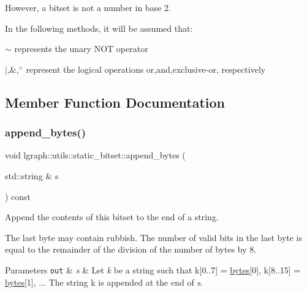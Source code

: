 However, a bitset is not a number in base 2.

In the following methods, it will be assumed that\+:
\begin{DoxyItemize}
\item $\sim$ represents the unary N\+OT operator
\item $\vert$,\&,$^\wedge$ represent the logical operations or,and,exclusive-\/or, respectively 
\end{DoxyItemize}

\subsection{Member Function Documentation}
\mbox{\label{classlgraph_1_1utils_1_1static__bitset_a38978e91cd3e39ce45417a0f3d0d6162}} 
\subsubsection{\texorpdfstring{append\+\_\+bytes()}{append\_bytes()}}
{\footnotesize\ttfamily void lgraph\+::utils\+::static\+\_\+bitset\+::append\+\_\+bytes (\begin{DoxyParamCaption}\item[{std\+::string \&}]{s }\end{DoxyParamCaption}) const}



Append the contents of this bitset to the end of a string. 

The last byte may contain rubbish. The number of valid bits in the last byte is equal to the remainder of the division of the number of bytes by 8.


\begin{DoxyParams}[1]{Parameters}
\mbox{\tt out}  & {\em s} & Let {\itshape k} be a string such that k\mbox{[}0..7\mbox{]} = \hyperlink{classlgraph_1_1utils_1_1static__bitset_a56d277fc22bbf71a27fca530a133c9bd}{bytes}\mbox{[}0\mbox{]}, k\mbox{[}8..15\mbox{]} = \hyperlink{classlgraph_1_1utils_1_1static__bitset_a56d277fc22bbf71a27fca530a133c9bd}{bytes}\mbox{[}1\mbox{]}, ... The string k is appended at the end of {\itshape s}. \\
\hline
\end{DoxyParams}
\mbox{\label{classlgraph_1_1utils_1_1static__bitset_a6013f8230ae37554328dfe0884d89c71}} 
